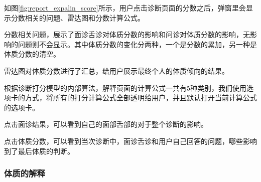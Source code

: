 如图\ref{fig:report_expalin_score}所示，用户点击诊断页面的分数之后，弹窗里会显示分数相关的问题、雷达图和分数计算公式。

分数相关问题，展示了面诊舌诊对体质分数的影响和问诊对体质分数的影响，无影响的问题则不会显示。其中体质分数的变化分两种，一个是分数的累加，另一种是体质分数的清空。

雷达图对体质分数进行了汇总，给用户展示最终个人的体质倾向的结果。

根据诊断打分模型的内部算法，解释页面的计算公式一共有5种类别，我们使用选项卡的方式，将所有的打分计算公式全部透明给用户，并且默认打开当前计算公式的选项卡。

点击面诊结果，可以看到自己的面部舌部的对于整个诊断的影响。

点击体质分数，可以看到当次诊断中，面诊舌诊和用户自己回答的问题，哪些影响到了最后体质的判断。

\subsubsection{体质的解释}

